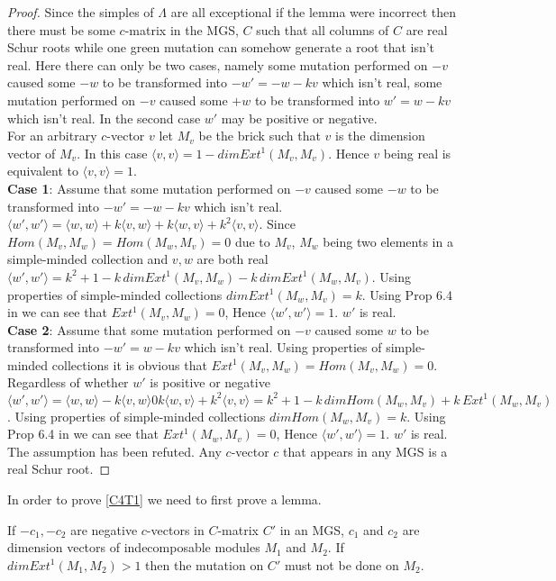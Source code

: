 \begin{proof}
\indent Since the simples of $\Lambda$ are all exceptional if the lemma were incorrect then there must be some $c$-matrix in the MGS, $C$ such that all columns of $C$ are real Schur roots while one green mutation can somehow generate a root that isn't real. Here there can only be two cases, namely some mutation performed on $-v$ caused some $-w$ to be transformed into $-w'=-w-kv$ which isn't real, some mutation performed on $-v$ caused some $+w$ to be transformed into $w'=w-kv$ which isn't real. In the second case $w'$ may be positive or negative.\\
\indent For an arbitrary $c$-vector $v$ let $M_v$ be the brick such that $v$ is the dimension vector of $M_v$. In this case $\langle v,v\rangle=1-dim Ext^1(M_v,M_v)$. Hence $v$ being real is equivalent to $\langle v,v\rangle=1$.\\
\indent \textbf{Case 1}: Assume that some mutation performed on $-v$ caused some $-w$ to be transformed into $-w'=-w-kv$ which isn't real. $\langle w', w'\rangle = \langle w, w\rangle + k\langle v,w\rangle + k\langle w,v\rangle + k^2\langle v,v\rangle$. Since $Hom(M_v, M_w) = Hom(M_w, M_v) = 0$ due to $M_v$, $M_w$ being two elements in a simple-minded collection and $v, w$ are both real  $\langle w', w'\rangle = k^2+1-k\, dim Ext^1(M_v, M_w) - k\, dim Ext^1(M_w, M_v)$. Using properties of simple-minded collections $dim Ext^1(M_w, M_v)  = k$. Using Prop 6.4 in \cite{KQ15} we can see that $Ext^1(M_v, M_w)  = 0$, Hence $\langle w', w'\rangle = 1$. $w'$ is real.\\
\indent \textbf{Case 2}: Assume that some mutation performed on $-v$ caused some $w$ to be transformed into $-w'=w-kv$ which isn't real. Using properties of simple-minded collections it is obvious that $Ext^1(M_v, M_w) = Hom(M_v, M_w) = 0$. Regardless of whether $w'$ is positive or negative $\langle w', w'\rangle = \langle w, w\rangle - k\langle v,w\rangle 0 k\langle w,v\rangle + k^2\langle v,v\rangle = k^2+1 -k\,dim Hom(M_w, M_v) + k\,Ext^1(M_w, M_v)$. Using properties of simple-minded collections $dim Hom(M_w, M_v)  = k$. Using Prop 6.4 in \cite{KQ15} we can see that $Ext^1(M_w, M_v)  = 0$, Hence $\langle w', w'\rangle = 1$. $w'$ is real.\\
\indent The assumption has been refuted. Any $c$-vector $c$ that appears in any MGS is a real Schur root.
\end{proof}
\indent In order to prove \ref{C4T1} we need to first prove a lemma.
\begin{lemma}\label{C4L}
\indent If $-c_1, -c_2$ are negative $c$-vectors in $C$-matrix $C'$ in an MGS, $c_1$ and $c_2$ are dimension vectors of indecomposable modules $M_1$ and $M_2$. If $dim Ext^1(M_1, M_2) > 1$ then the mutation on $C'$ must not be done on $M_2$.
\end{lemma}
